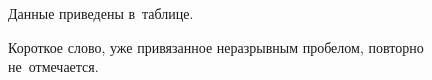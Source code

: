 Данные приведены в~таблице.

Короткое слово, уже привязанное неразрывным пробелом, повторно не~отмечается.
